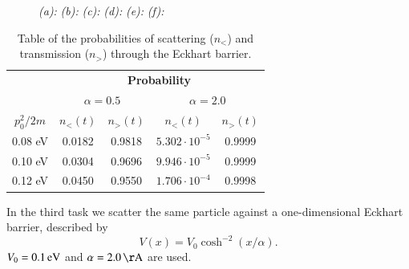 \begin{figure}

\centering
\begin{subfigure}[t]{0.47\textwidth}
	\caption{}
	\label{fig:3_a}
\end{subfigure}
\begin{subfigure}[t]{0.47\textwidth}
	\caption{}
	\label{fig:3_b}
\end{subfigure}

\begin{subfigure}[t]{0.47\textwidth}
	\caption{}
	\label{fig:3_c}
\end{subfigure}
\begin{subfigure}[t]{0.47\textwidth}
	\caption{}
	\label{fig:3_d}
\end{subfigure}

\begin{subfigure}[t]{0.47\textwidth}
	\caption{}
	\label{fig:3_e}
\end{subfigure}
\begin{subfigure}[t]{0.47\textwidth}
	\caption{}
	\label{fig:3_f}
\end{subfigure}

\caption{
	\textit{(a):} 
	\textit{(b):} 
	\textit{(c):} 
	\textit{(d):} 
	\textit{(e):} 
	\textit{(f):} 
}
\label{fig:3}
\end{figure}

\begin{table}
	\centering
	\caption{Table of the probabilities of scattering ($n_<$) and transmission ($n_>$) through the Eckhart barrier.}
	\begin{tabular}{c|cc|cc}
					& \multicolumn{4}{c}{\textbf{Probability}} \\
					& \multicolumn{2}{c|}{$\alpha = 0.5$} & \multicolumn{2}{c}{$\alpha = 2.0$} \\
		$p_0^2/2m$	& $n_<(t)$	& $n_>(t)$	& $n_<(t)$	& $n_>(t)$	\\ \hline
		0.08 eV		& 0.0182	& 0.9818	& $5.302 \cdot 10^{-5}$	& 0.9999	\\
		0.10 eV		& 0.0304	& 0.9696	& $9.946 \cdot 10^{-5}$	& 0.9999	\\
		0.12 eV		& 0.0450	& 0.9550	& $1.706 \cdot 10^{-4}$	& 0.9998
	\end{tabular}
	\label{tab:3}
\end{table}

In the third task we scatter the same particle against a one-dimensional Eckhart barrier, described by
\begin{equation}
V(x) = V_0 \cosh^{-2} (x/\alpha).
\end{equation}
$V_0 = \unit[0.1]{eV}$ and $\alpha = \unit[2.0]{\AA}$ are used.


